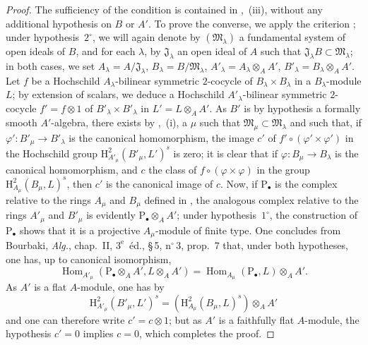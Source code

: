 \begin{proof}
The sufficiency of the condition is contained in ,~(iii), without any additional hypothesis on $B$ or $A'$.
To prove the converse, we apply the criterion ;
under hypothesis~$2^\circ$, we will again denote by $(\mathfrak{M}_\lambda)$ a fundamental system of open ideals of $B$, and for each $\lambda$, by $\mathfrak{J}_\lambda$ an open ideal of $A$ such that $\mathfrak{J}_\lambda B\subset\mathfrak{M}_\lambda$;
in both cases, we set $A_\lambda=A/\mathfrak{J}_\lambda$, $B_\lambda=B/\mathfrak{M}_\lambda$, $A'_\lambda=A_\lambda\otimes_A A'$, $B'_\lambda=B_\lambda\otimes_A A'$.
Let $f$ be a Hochschild $A_\lambda$-bilinear symmetric $2$-cocycle of $B_\lambda\times B_\lambda$ in a $B_\lambda$-module $L$;
by extension of scalars, we deduce a Hochschild $A'_\lambda$-bilinear symmetric $2$-cocycle $f'=f\otimes1$ of $B'_\lambda\times B'_\lambda$ in $L'=L\otimes_A A'$.
As $B'$ is by hypothesis a formally smooth $A'$-algebra, there exists by ,~(i), a $\mu$ such that $\mathfrak{M}_\mu\subset\mathfrak{M}_\lambda$ and such that, if $\varphi':B'_\mu\to B'_\lambda$ is the canonical homomorphism, the image $c'$ of $f'\circ(\varphi'\times\varphi')$ in the Hochschild group $\mathrm{H}^2_{A'_\mu}(B'_\mu,L')^s$ is zero;
it is clear that if $\varphi:B_\mu\to B_\lambda$ is the canonical homomorphism, and $c$ the class of $f\circ(\varphi\times\varphi)$ in the group $\mathrm{H}^2_{A_\mu}(B_\mu,L)^s$, then $c'$ is the canonical image of $c$.
Now, if $\mathrm{P}_\bullet$ is the complex relative to the rings $A_\mu$ and $B_\mu$ defined in , the analogous complex relative to the rings $A'_\mu$ and $B'_\mu$ is evidently $\mathrm{P}_\bullet\otimes_A A'$;
under hypothesis~$1^\circ$, the construction of $\mathrm{P}_\bullet$ shows that it is a projective $A_\mu$-module of finite type.
One concludes from Bourbaki, \emph{Alg.}, chap.~II, $3^{\text{e}}$~\'{e}d., \S\,5, n$^\circ$\,3, prop.~7 that, under both hypotheses, one has, up to canonical isomorphism,
\[
  \operatorname{Hom}_{A'_\mu}(\mathrm{P}_\bullet\otimes_A A',L\otimes_A A')
  =\operatorname{Hom}_{A_\mu}(\mathrm{P}_\bullet,L)\otimes_A A'.
\]
As $A'$ is a flat $A$-module, one has by 
\[
  \mathrm{H}^2_{A'_\mu}(B'_\mu,L')^s = (\mathrm{H}^2_{A_\mu}(B_\mu,L)^s)\otimes_A A'
\]
and one can therefore write $c'=c\otimes 1$;
but as $A'$ is a faithfully flat $A$-module, the hypothesis $c'=0$ implies $c=0$, which completes the proof.
\end{proof}

